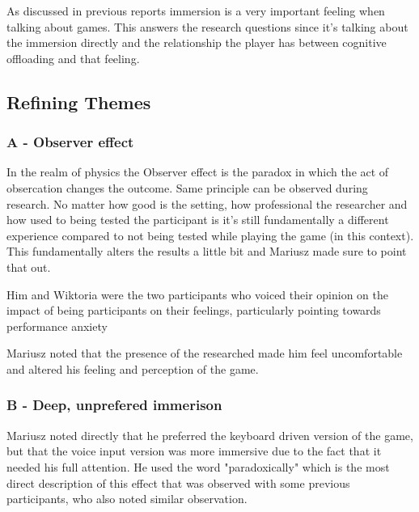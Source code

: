 
As discussed in previous reports immersion is a very important feeling when talking about games. This answers the research questions since it's talking about the immersion directly and the relationship the player has between cognitive offloading and that feeling. 



\subsection{Refining Themes}

\subsubsection{A - Observer effect}

In the realm of physics the Observer effect is the paradox in which the act of obsercation changes the outcome.
Same principle can be observed during research. No matter how good is the setting, how professional the researcher and how used to being tested the participant is it's still fundamentally a different experience compared to not being tested while playing the game (in this context). This fundamentally alters the results a little bit and Mariusz made sure to point that out.

Him and Wiktoria were the two participants who voiced their opinion on the impact of being participants on their feelings, particularly pointing towards performance anxiety 

Mariusz noted that the presence of the researched made him feel uncomfortable and altered his feeling and perception of the game. 


\subsubsection{B - Deep, unprefered immerison}

Mariusz noted directly that he preferred the keyboard driven version of the game, but that the voice input version was more immersive due to the fact that it needed his full attention. He used the word "paradoxically" which is the most direct description of this effect that was observed with some previous participants, who also noted similar observation. 

